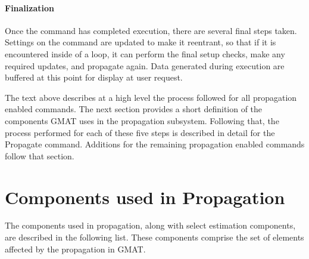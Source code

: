 \documentclass[10pt]{article}
\begin{document}
\paragraph{Finalization}

Once the command has completed execution, there are several final steps taken.  Settings on the command are updated to make it reentrant, so that if it is encountered inside of a loop, it can perform the final setup checks, make any required updates, and propagate again.  Data generated during execution are buffered at this point for display at user request.

The text above describes at a high level the process followed for all propagation enabled commands.  The next section provides a short definition of the components GMAT uses in the propagation subsystem.  Following that, the process performed for each of these five steps is described in detail for the Propagate command.  Additions for the remaining propagation enabled commands follow that section.

\section{Components used in Propagation}

The components used in propagation, along with select estimation components, are described in the following list.  These components comprise the set of elements affected by the propagation in GMAT.
\end{document}
